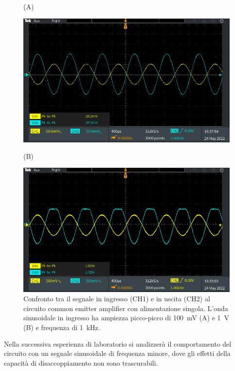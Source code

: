 \begin{figure}[h!]
	\centering
	(A)
	
	\includegraphics[width=0.7\linewidth]{./ImageFiles/Laboratorio 3/TEK00010}
	\vspace{1cm}
	
	(B)
	
	\includegraphics[width=0.7\linewidth]{./ImageFiles/Laboratorio 3/TEK00011}
	\caption{Confronto tra il segnale in ingresso (CH1) e in uscita (CH2) al circuito common emitter amplifier con alimentazione singola. L'onda sinusoidale in ingresso ha ampiezza picco-picco di \SI{100}{\milli\volt} (A) e \SI{1}{\volt} (B) e frequenza di \SI{1}{\kilo\hertz}.}
	\label{fig:commonemitter_se_guadagno}
\end{figure}

\noindent
Nella successiva esperienza di laboratorio si analizzerà il comportamento del circuito con un segnale sinusoidale di frequenza minore, dove gli effetti della capacità di disaccoppiamento non sono trascurabili.